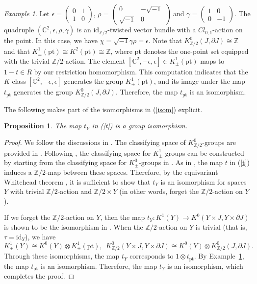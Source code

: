 \documentclass{amsart}
\theoremstyle{plain}
\newtheorem{proposition}[theorem]{Proposition}
\theoremstyle{definition}
\theoremstyle{remark}
\newtheorem{example}[theorem]{Example}
\newcommand{\Z}{\mathbb{Z}}
\newcommand{\C}{\mathbb{C}}
\newcommand{\pt}{\mathrm{pt}}
\newcommand{\id}{\mathrm{id}}
\begin{document}
\begin{example}
\label{expt}
Let
$\epsilon =
\begin{pmatrix}
0 & 1\\
1 & 0
\end{pmatrix}$,
$\rho =
\begin{pmatrix}
0 & -\sqrt{-1}\\
\sqrt{-1} & 0
\end{pmatrix}$
and
$\gamma =
\begin{pmatrix}
1 & 0\\
0 & -1
\end{pmatrix}$.
The quadruple $(\C^2, \epsilon, \rho, \gamma)$ is an $\id_{\Z/2}$-twisted vector bundle with a $Cl_{0,1}$-action on the point.
In this case, we have $\chi = \sqrt{-1}\gamma \rho = \epsilon$.
Note that $K^0_{\Z/2}(J, \partial J) \cong \Z$ and that $K^1_\pm(\pt) \cong K^2(\pt) \cong \Z$, where $\pt$ denotes the one-point set equipped with the trivial $\Z/2$-action.
The element $[\C^2, -\epsilon, \epsilon] \in K^1_{\pm}(\pt)$ maps to $1-t \in R$ by our restriction homomorphism.
This computation indicates that the $K$-class $[\C^2, -\epsilon, \epsilon]$ generates the group $K^1_{\pm}(\pt)$, and its image under the map $t_{\pt}$ generates the group $K^0_{\Z/2}(J, \partial J)$.
Therefore, the map $t_{\pt}$ is an isomorphism.
\end{example}

The following makes part of the isomorphisms in (\ref{isom}) explicit.
\begin{proposition}
\label{mapt}
The map $t_Y$ in (\ref{t}) is a group isomorphism.
\end{proposition}
\begin{proof}
We follow the discussions in \cite{AH04}.
The classifying space of $K^0_{\Z/2}$-groups are provided in \cite{Mat71b,KP74}.
Following \cite{AS69}, the classifying space for $K^1_{\pm}$-groups can be constructed by starting from the classifying space for $K^0_{\pm}$-groups in \cite{AH04}.
As in \cite[Chapter~III]{Karoubi78}, the map $t$ in (\ref{t}) induces a $\Z/2$-map between these spaces.
Therefore, by the equivariant Whitehead theorem \cite{Bre67,Mat71a}, it is sufficient to show that $t_Y$ is an isomorphism for spaces $Y$ with trivial $\Z/2$-action and $\Z/2 \times Y$ (in other words, forget the $\Z/2$-action on $Y$).

If we forget the $\Z/2$-action on $Y$, then the map
$t_Y \colon K^{1}(Y) \to K^0(Y \times J, Y \times \partial J)$ is shown to be the isomorphism in \cite[Chapter~III, Theorem 5.10]{Karoubi78}.
When the $\Z/2$-action on $Y$ is trivial (that is, $\tau = \id_Y$), we have
\begin{equation*}
K^1_\pm(Y)  \cong K^0(Y) \otimes K^1_\pm(\pt), \ \
K^0_{\Z/2}(Y \times J, Y \times \partial J) \cong K^0(Y) \otimes K^0_{\Z/2}(J, \partial J).
\end{equation*}
Through these isomorphisms, the map $t_Y$ corresponds to $1 \otimes t_{\pt}$.
By Example~\ref{expt}, the map $t_{\pt}$ is an isomorphism.
Therefore, the map $t_Y$ is an isomorphism, which completes the proof.
\end{proof}
\end{document}
